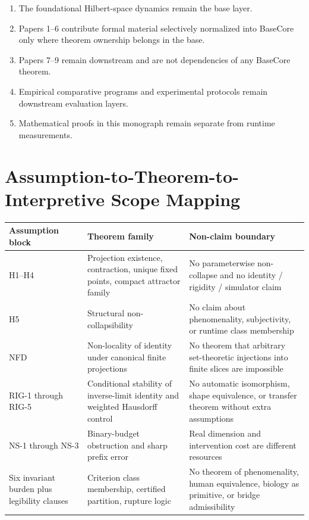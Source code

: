 \begin{enumerate}[leftmargin=*]
\item The foundational Hilbert-space dynamics remain the base layer.
\item Papers 1--6 contribute formal material selectively normalized into BaseCore only where theorem ownership belongs in the base.
\item Papers 7--9 remain downstream and are not dependencies of any BaseCore theorem.
\item Empirical comparative programs and experimental protocols remain downstream evaluation layers.
\item Mathematical proofs in this monograph remain separate from runtime measurements.
\end{enumerate}

\section{Assumption-to-Theorem-to-Interpretive Scope Mapping}

\renewcommand{\arraystretch}{1.12}
\footnotesize
\begin{tabularx}{\textwidth}{P{0.20\textwidth} P{0.22\textwidth} Y}
\toprule
\textbf{Assumption block} & \textbf{Theorem family} & \textbf{Non-claim boundary} \\
\midrule
H1--H4 & Projection existence, contraction, unique fixed points, compact attractor family & No parameterwise non-collapse and no identity / rigidity / simulator claim \\
H5 & Structural non-collapsibility & No claim about phenomenality, subjectivity, or runtime class membership \\
NFD & Non-locality of identity under canonical finite projections & No theorem that arbitrary set-theoretic injections into finite slices are impossible \\
RIG-1 through RIG-5 & Conditional stability of inverse-limit identity and weighted Hausdorff control & No automatic isomorphism, shape equivalence, or transfer theorem without extra assumptions \\
NS-1 through NS-3 & Binary-budget obstruction and sharp prefix error & Real dimension and intervention cost are different resources \\
Six invariant burden plus legibility clauses & Criterion class membership, certified partition, rupture logic & No theorem of phenomenality, human equivalence, biology as primitive, or bridge admissibility \\
\bottomrule
\end{tabularx}
\normalsize

